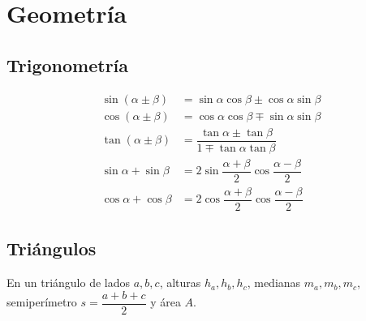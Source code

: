 \chapter{Geometría}

\section{Trigonometría}
\begin{align*}
\sin(\alpha \pm \beta)&{}=\sin \alpha \cos \beta \pm \cos \alpha \sin \beta\\
\cos(\alpha \pm \beta)&{}=\cos \alpha \cos \beta \mp \sin \alpha \sin \beta\\
\tan(\alpha \pm \beta)&{}=\dfrac{\tan \alpha \pm \tan \beta}{1 \mp \tan \alpha \tan \beta}\\
\sin \alpha + \sin \beta &{} = 2\sin\dfrac{\alpha + \beta}{2}\cos\dfrac{\alpha - \beta}{2}\\
\cos \alpha + \cos \beta&{}=2\cos\dfrac{\alpha + \beta}{2}\cos\dfrac{\alpha - \beta}{2}
\end{align*}




\section{Triángulos}
En un triángulo de lados $a,b,c$, alturas $h_a, h_b, h_c$, medianas $m_a, m_b, m_c$, semiperímetro $s = \dfrac{a + b + c}{2}$ y área $A$.\\
\medskip

